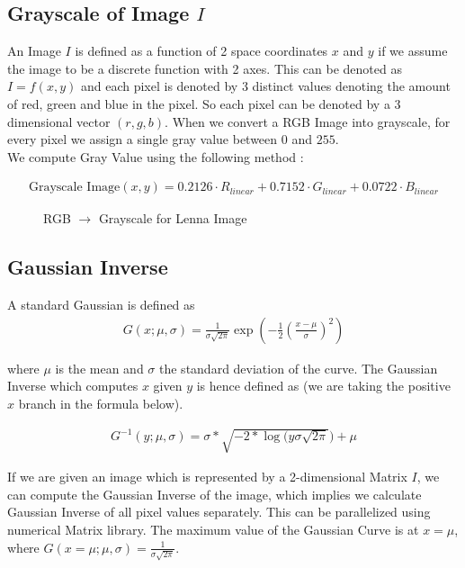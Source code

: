 \documentclass{article}
\begin{document}
\subsection{Grayscale of Image $I$}
An Image $I$ is defined as a function of 2 space coordinates $x$ and $y$ if we assume the image to be a 
discrete function with 2 axes. This can be denoted as $I = f(x, y)$ and each pixel is denoted by 3 distinct values denoting the amount of red, green and blue in the pixel. So each pixel can be denoted
by a 3 dimensional vector $(r, g, b)$. When we convert a RGB Image into grayscale, for every pixel we assign a single gray value between $0$ and $255$. \\

We compute Gray Value using the following method \cite{grayscale-image}:

\begin{align*}
    \text{Grayscale Image}(x, y) = 0.2126 \cdot R_{linear} + 0.7152 \cdot G_{linear} + 0.0722 \cdot B_{linear}
\end{align*}

\begin{figure}[ht]
    \centering
    \qquad
    \qquad
    \caption{RGB $\rightarrow$ Grayscale for Lenna Image \label{fig:lenna-gaussian-inverse}}
\end{figure}

\subsection{Gaussian Inverse}
A standard Gaussian is defined as  
\begin{align*}
    G(x ; \mu, \sigma) = \frac{1}{\sigma \sqrt{2 \pi}} \exp \left( - \frac{1}{2} \left( \frac{x - \mu}{\sigma}\right) ^2 \right)
\end{align*}

where $\mu$ is the mean and $\sigma$ the standard deviation of the curve. The Gaussian Inverse which 
computes $x$ given $y$ is hence defined as (we are taking the positive $x$ branch in the formula below).

\begin{align*}
    G^{-1}(y ; \mu, \sigma) = \sigma * \sqrt{-2 * \log(y \sigma \sqrt{2 \pi}}) + \mu
\end{align*}

If we are given an image which is represented by a 2-dimensional Matrix $I$, we can compute the Gaussian Inverse of the image, which implies we calculate Gaussian Inverse of all pixel values separately. This can be parallelized using numerical Matrix library. The maximum value of the Gaussian Curve is at $x = \mu$, where $G(x = \mu ; \mu, \sigma) = \frac{1}{\sigma \sqrt{2 \pi}}$. \\
\end{document}
